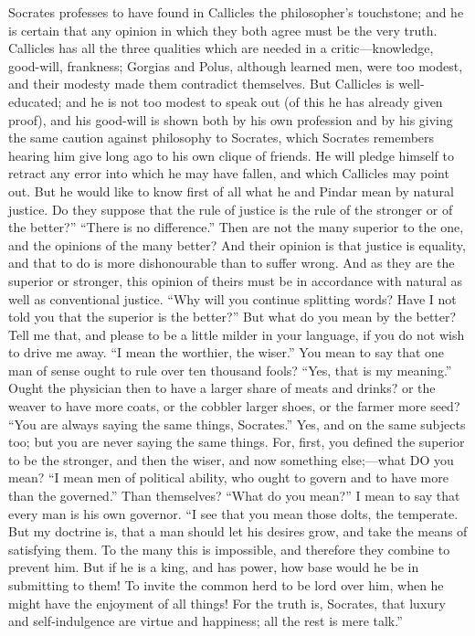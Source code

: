 \documentclass[11pt,letter]{article}
\begin{document}
\par  Socrates professes to have found in Callicles the philosopher’s touchstone; and he is certain that any opinion in which they both agree must be the very truth. Callicles has all the three qualities which are needed in a critic—knowledge, good-will, frankness; Gorgias and Polus, although learned men, were too modest, and their modesty made them contradict themselves. But Callicles is well-educated; and he is not too modest to speak out (of this he has already given proof), and his good-will is shown both by his own profession and by his giving the same caution against philosophy to Socrates, which Socrates remembers hearing him give long ago to his own clique of friends. He will pledge himself to retract any error into which he may have fallen, and which Callicles may point out. But he would like to know first of all what he and Pindar mean by natural justice. Do they suppose that the rule of justice is the rule of the stronger or of the better?” “There is no difference.” Then are not the many superior to the one, and the opinions of the many better? And their opinion is that justice is equality, and that to do is more dishonourable than to suffer wrong. And as they are the superior or stronger, this opinion of theirs must be in accordance with natural as well as conventional justice. “Why will you continue splitting words? Have I not told you that the superior is the better?” But what do you mean by the better? Tell me that, and please to be a little milder in your language, if you do not wish to drive me away. “I mean the worthier, the wiser.” You mean to say that one man of sense ought to rule over ten thousand fools? “Yes, that is my meaning.” Ought the physician then to have a larger share of meats and drinks? or the weaver to have more coats, or the cobbler larger shoes, or the farmer more seed? “You are always saying the same things, Socrates.” Yes, and on the same subjects too; but you are never saying the same things. For, first, you defined the superior to be the stronger, and then the wiser, and now something else;—what DO you mean? “I mean men of political ability, who ought to govern and to have more than the governed.” Than themselves? “What do you mean?” I mean to say that every man is his own governor. “I see that you mean those dolts, the temperate. But my doctrine is, that a man should let his desires grow, and take the means of satisfying them. To the many this is impossible, and therefore they combine to prevent him. But if he is a king, and has power, how base would he be in submitting to them! To invite the common herd to be lord over him, when he might have the enjoyment of all things! For the truth is, Socrates, that luxury and self-indulgence are virtue and happiness; all the rest is mere talk.”
\end{document}
